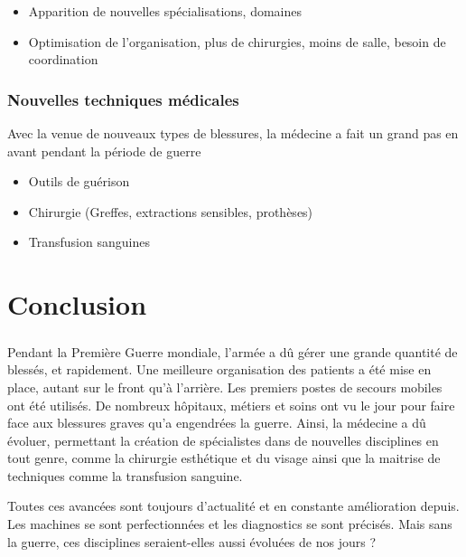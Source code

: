 \documentclass[a4paper, BCOR=0mm, fontsize=12pt, titlepage=firstiscover]{scrreprt}
\begin{document}
		\begin{itemize}
			\item Apparition de nouvelles spécialisations, domaines
			\item Optimisation de l'organisation, plus de chirurgies, moins de salle, besoin de coordination
		\end{itemize}
		\subsection{Nouvelles techniques médicales}
		Avec la venue de nouveaux types de blessures, la médecine a fait un grand pas en avant pendant la période de guerre
		
		\begin{itemize}
			\item Outils de guérison
			\item Chirurgie (Greffes, extractions sensibles, prothèses)
			\item Transfusion sanguines
		\end{itemize}
	\chapter*{Conclusion}
		\paragraph{}
		Pendant la Première Guerre mondiale, l'armée a dû gérer une grande quantité de blessés, et rapidement. Une meilleure organisation des patients a été mise en place, autant sur le front qu'à l'arrière. Les premiers postes de secours mobiles ont été utilisés. De nombreux hôpitaux, métiers et soins ont vu le jour pour faire face aux blessures graves qu'a engendrées la guerre. Ainsi, la médecine a dû évoluer, permettant la création de spécialistes dans de nouvelles disciplines en tout genre, comme la chirurgie esthétique et du visage ainsi que la maitrise de techniques comme la transfusion sanguine. 
		
		Toutes ces avancées sont toujours d'actualité et en constante amélioration depuis. Les machines se sont perfectionnées et les diagnostics se sont précisés. Mais sans la guerre, ces disciplines seraient-elles aussi évoluées de nos jours ?

	\printindex
	\nocite{*}
	\printglossary[title=Glossaire et abbréviations,toctitle=Glossaire et abbréviations]
	
\end{document}
